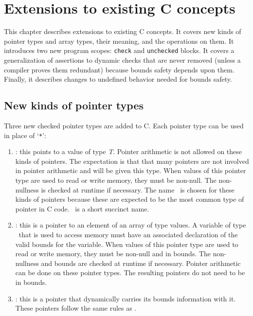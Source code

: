 
\chapter{Extensions to existing C concepts}
\label{chapter:core-extensions}

This chapter describes extensions to existing C concepts. 
It covers new kinds of pointer types and array types, their meaning,
and the operations  on them.   It introduces two
new program scopes: \texttt{check} and \texttt{unchecked}
blocks. It covers a generalization of assertions to 
dynamic checks that are never  removed (unless a compiler
proves them redundant) because bounds safety depends upon them. 
Finally, it describes changes to
undefined behavior needed for bounds safety.

\section{New kinds of pointer types}
Three new checked pointer types are added to C. Each pointer type can be
used in place of `\texttt{*}':
\begin{enumerate}
\item
  \ptrT: this points to
  a value of type \textit{T}. Pointer arithmetic is not allowed on these
  kinds of pointers. The expectation is that that many pointers are not
  involved in pointer arithmetic and will be given this type. When
  values of this pointer type are used to read or write memory, they
  must be non-null. The non-nullness is checked at runtime if necessary.
  The name \ptr\ is chosen for these kinds of pointers because these
  are expected to be the most common type of pointer in C code. \ptr\
  is a short succinct name.
\item
  \arrayptrT: this is
  a pointer to an element of an array of type  values. A
  variable of type \arrayptr\ that is used to access memory
  must have an associated declaration of the valid bounds for the
  variable. When values of this pointer type are used to read or write
  memory, they must be non-null and in bounds. The non-nullness and
  bounds are checked at runtime if necessary. Pointer arithmetic can be
  done on these pointer types. The resulting pointers do not need to be
  in bounds.
\item
  \spanptrT: this
  is a pointer that dynamically carries its bounds information with it.
  These pointers follow the same rules as
  \arrayptrT .
\end{enumerate}

